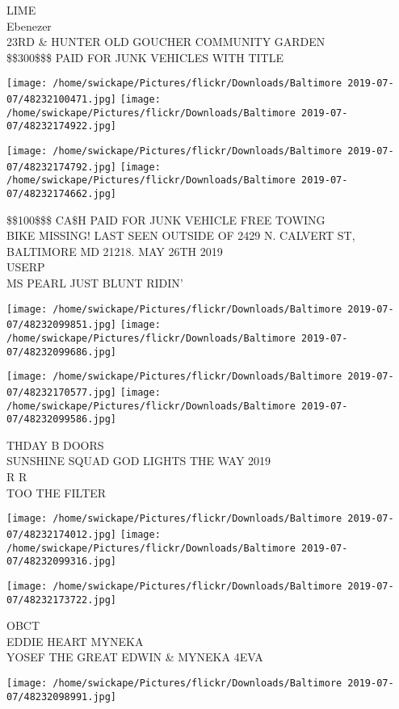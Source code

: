 \documentclass[10pt,letterpaper]{article}
\begin{document}
LIME\\
Ebenezer\\
23RD \& HUNTER OLD GOUCHER COMMUNITY GARDEN\\
\$\$300\$\$\$ PAID FOR JUNK VEHICLES WITH TITLE
\pagebreak

\texttt{[image: /home/swickape/Pictures/flickr/Downloads/Baltimore 2019-07-07/48232100471.jpg]}
\texttt{[image: /home/swickape/Pictures/flickr/Downloads/Baltimore 2019-07-07/48232174922.jpg]}

\texttt{[image: /home/swickape/Pictures/flickr/Downloads/Baltimore 2019-07-07/48232174792.jpg]}
\texttt{[image: /home/swickape/Pictures/flickr/Downloads/Baltimore 2019-07-07/48232174662.jpg]}

\$\$100\$\$\$ CA\$H PAID FOR JUNK VEHICLE FREE TOWING\\
BIKE MISSING!  LAST SEEN OUTSIDE OF 2429 N. CALVERT ST, BALTIMORE MD 21218.  MAY 26TH 2019\\
USERP\\
MS PEARL JUST BLUNT RIDIN'
\pagebreak

\texttt{[image: /home/swickape/Pictures/flickr/Downloads/Baltimore 2019-07-07/48232099851.jpg]}
\texttt{[image: /home/swickape/Pictures/flickr/Downloads/Baltimore 2019-07-07/48232099686.jpg]}

\texttt{[image: /home/swickape/Pictures/flickr/Downloads/Baltimore 2019-07-07/48232170577.jpg]}
\texttt{[image: /home/swickape/Pictures/flickr/Downloads/Baltimore 2019-07-07/48232099586.jpg]}

THDAY B DOORS\\
SUNSHINE SQUAD GOD LIGHTS THE WAY 2019\\
R R\\
TOO THE FILTER
\pagebreak

\texttt{[image: /home/swickape/Pictures/flickr/Downloads/Baltimore 2019-07-07/48232174012.jpg]}
\texttt{[image: /home/swickape/Pictures/flickr/Downloads/Baltimore 2019-07-07/48232099316.jpg]}

\texttt{[image: /home/swickape/Pictures/flickr/Downloads/Baltimore 2019-07-07/48232173722.jpg]}

OBCT\\
EDDIE HEART MYNEKA\\
YOSEF THE GREAT EDWIN \& MYNEKA 4EVA
\pagebreak

\texttt{[image: /home/swickape/Pictures/flickr/Downloads/Baltimore 2019-07-07/48232098991.jpg]}
\end{document}
